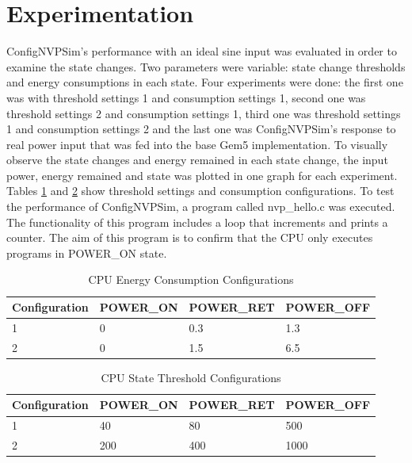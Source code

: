\documentclass[conference]{IEEEtran}
\begin{document}
\section{\textbf{Experimentation}}
ConfigNVPSim's performance with an ideal sine input was evaluated in order to examine the state changes. Two parameters were variable: state change thresholds and energy consumptions in each state. Four experiments were done: the first one was with threshold settings 1 and consumption settings 1, second one was threshold settings 2 and consumption settings 1, third one was threshold settings 1 and consumption settings 2 and the last one was ConfigNVPSim's response to real power input that was fed into the base Gem5 implementation. To visually observe the state changes and energy remained in each state change,  the input power, energy remained and state was plotted in one graph for each experiment. Tables \ref{table:cpuconsumption} and \ref{table:cputhresh} show threshold settings and consumption configurations.
To test the performance of ConfigNVPSim, a program called nvp\_hello.c was executed. The functionality of this program includes a loop that increments and prints a counter. The aim of this program is to confirm that the CPU only executes programs in POWER\_ON state. 
\begin{table}[]
\medskip
\begin{center}
\begin{tabular}{|l|l|l|l|}
\hline
\rowcolor[HTML]{D9D9D9} 
Configuration & POWER\_ON & POWER\_RET & POWER\_OFF \\ \hline
1             & 0         & 0.3        & 1.3        \\ \hline
2             & 0         & 1.5        & 6.5        \\ \hline
\end{tabular}
\end{center}
\medskip
\caption{CPU Energy Consumption Configurations}
\label{table:cpuconsumption}
\end{table}

\begin{table}[]
\medskip
\begin{center}
\begin{tabular}{|l|l|l|l|}
\hline
\rowcolor[HTML]{D9D9D9} 
Configuration & POWER\_ON & POWER\_RET & POWER\_OFF \\ \hline
1             & 40        & 80         & 500        \\ \hline
2             & 200       & 400        & 1000       \\ \hline
\end{tabular}
\end{center}
\medskip
\caption{CPU State Threshold Configurations}
\label{table:cputhresh}
\end{table}
\end{document}
